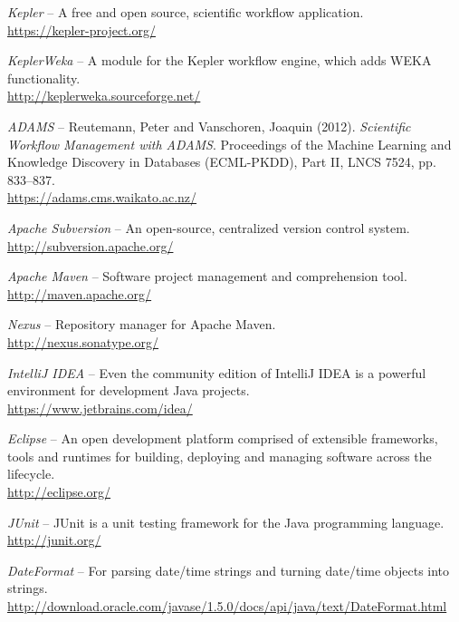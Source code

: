 
\begin{thebibliography}{999}

		\textit{Kepler} -- A free and open source, scientific workflow application. \\
		\url{https://kepler-project.org/}{}

		\textit{KeplerWeka} -- A module for the Kepler workflow engine, which adds
		WEKA functionality. \\
		\url{http://keplerweka.sourceforge.net/}{}

		\textit{ADAMS} -- Reutemann, Peter and Vanschoren, Joaquin (2012).
		\textit{Scientific Workflow Management with ADAMS}. Proceedings
		of the Machine Learning and Knowledge Discovery in Databases
		(ECML-PKDD), Part II, LNCS 7524, pp. 833–837. \\
		\url{https://adams.cms.waikato.ac.nz/}{}

		\textit{Apache Subversion} -- An open-source, centralized version control
		system. \\
		\url{http://subversion.apache.org/}{}

		\textit{Apache Maven} -- Software project management and comprehension tool.
		\\
		\url{http://maven.apache.org/}{}

		\textit{Nexus} -- Repository manager for Apache Maven. \\
		\url{http://nexus.sonatype.org/}{}

		\textit{IntelliJ IDEA} -- Even the community edition of IntelliJ IDEA
		is a powerful environment for development Java projects. \\
		\url{https://www.jetbrains.com/idea/}{}

		\textit{Eclipse} -- An open development platform comprised of extensible
		frameworks, tools and runtimes for building, deploying and managing
		software across the lifecycle. \\
		\url{http://eclipse.org/}{}

		\textit{JUnit} -- JUnit is a unit testing framework for the Java
		programming language. \\
		\url{http://junit.org/}{}
		
		\textit{DateFormat} -- For parsing date/time strings and turning date/time
		objects into strings.
		\url{http://download.oracle.com/javase/1.5.0/docs/api/java/text/DateFormat.html}{}
		

\end{thebibliography}

